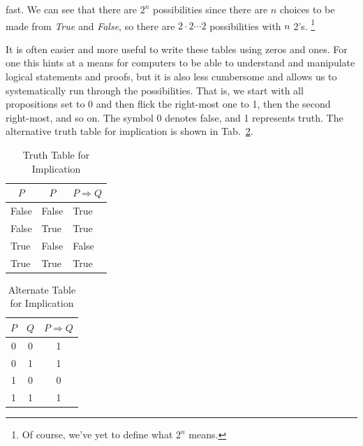         fast. We can see that there are $2^{n}$ possibilities since there are
        $n$ choices to be made from \textit{True} and \textit{False}, so there
        are $2\cdot{2}\cdots{2}$ possibilities with $n$ 2's.%
        \footnote{Of course, we've yet to define what $2^{n}$ means.}
        \par\hfill\par
        It is often easier and more useful to write these tables using zeros and
        ones. For one this hints at a means for computers to be able to
        understand and manipulate logical statements and proofs, but it is also
        less cumbersome and allows us to systematically run through the
        possibilities. That is, we start with all propositions set to 0 and then
        flick the right-most one to 1, then the second right-most, and so on.
        The symbol 0 denotes false, and 1 represents truth. The alternative
        truth table for implication is shown in
        Tab.~\ref{tab:Alternate_Truth_Table_Implication}.
        \par
        \begin{minipage}[b]{0.49\textwidth}
            \centering
            \begin{table}[H]
                \centering
                \captionsetup{type=table}
                \begin{tabular}{l|l|l}
                    \multicolumn{1}{c|}{$P$}&\multicolumn{1}{c|}{$P$}&
                    \multicolumn{1}{c}{$P\Rightarrow{Q}$}\\
                    \hline
                    False&False&True\\
                    False&True&True\\
                    True&False&False\\
                    True&True&True
                \end{tabular}
                \caption{Truth Table for Implication}
                \label{tab:Truth_Table_Implication}
            \end{table}
        \end{minipage}\hfill
        \begin{minipage}[b]{0.49\textwidth}
            \centering
            \begin{table}[H]
                \centering
                \captionsetup{type=table}
                \begin{tabular}{c|c|c}
                    $P$&$Q$&$P\Rightarrow{Q}$\\
                    \hline
                    0&0&1\\
                    0&1&1\\
                    1&0&0\\
                    1&1&1
                \end{tabular}
                \caption{Alternate Table for Implication}
                \label{tab:Alternate_Truth_Table_Implication}
            \end{table}
        \end{minipage}
